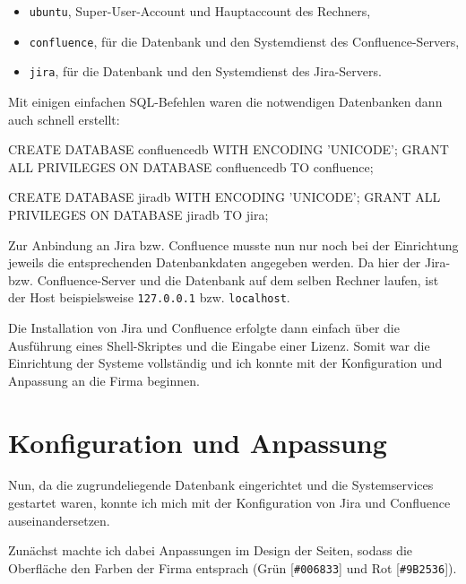 \documentclass[xcolor=dvipsnames,11pt,paper=a4paper]{report}
\begin{document}
\begin{itemize}
	\item \texttt{ubuntu}, Super-User-Account und Hauptaccount des Rechners,
	\item \texttt{confluence}, für die Datenbank und den Systemdienst des Confluence-Servers,
	\item \texttt{jira}, für die Datenbank und den Systemdienst des Jira-Servers.
\end{itemize}

Mit einigen einfachen SQL-Befehlen waren die notwendigen Datenbanken dann auch schnell
erstellt:

\begin{code}[language=SQL, caption={SQL-Befehle zur Erstellung der Datenbanken}]
CREATE DATABASE confluencedb WITH ENCODING 'UNICODE';
GRANT ALL PRIVILEGES ON DATABASE confluencedb TO confluence;

CREATE DATABASE jiradb WITH ENCODING 'UNICODE';
GRANT ALL PRIVILEGES ON DATABASE jiradb TO jira;
\end{code}

Zur Anbindung an Jira bzw. Confluence musste nun nur noch bei der Einrichtung jeweils
die entsprechenden Datenbankdaten angegeben werden. Da hier der Jira- bzw. Confluence-Server
und die Datenbank auf dem selben Rechner laufen, ist der Host beispielsweise \texttt{127.0.0.1}
bzw. \texttt{localhost}.

Die Installation von Jira und Confluence erfolgte dann einfach über die Ausführung
eines Shell-Skriptes und die Eingabe einer Lizenz. Somit war die Einrichtung der
Systeme vollständig und ich konnte mit der Konfiguration und Anpassung an die Firma
beginnen.



\section{Konfiguration und Anpassung}

Nun, da die zugrundeliegende Datenbank eingerichtet und die Systemservices gestartet
waren, konnte ich mich mit der Konfiguration von Jira und Confluence auseinandersetzen.

Zunächst machte ich dabei Anpassungen im Design der Seiten, sodass die Oberfläche
den Farben der Firma entsprach (\textcolor[HTML]{006833}{Grün [\texttt{\#006833}]}
und \textcolor[HTML]{9B2536}{Rot [\texttt{\#9B2536}]}).




\end{document}
